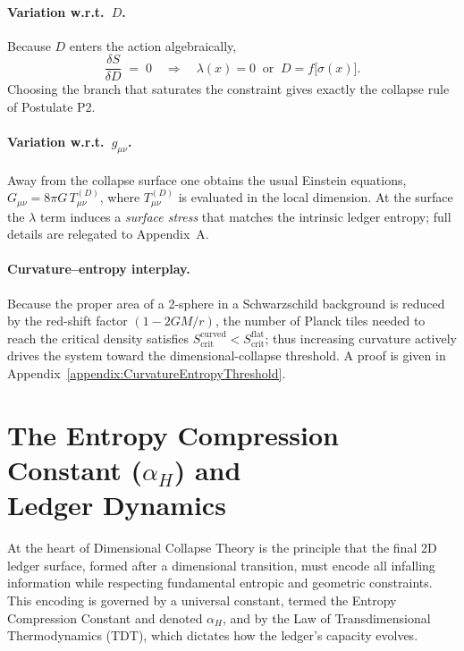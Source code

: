 \documentclass[a4paper, 12pt, oneside]{book}
\numberwithin{equation}{chapter}
\begin{document}
\paragraph{Variation w.r.t.~$D$.}
Because $D$ enters the action algebraically,
\[
    \frac{\delta S}{\delta D}\;=\;0
    \quad\Longrightarrow\quad
    \lambda(x) = 0
    \;\;\text{or}\;\;
    D = f\!\bigl[\sigma(x)\bigr].
\]
Choosing the branch that saturates the constraint gives
exactly the collapse rule of Postulate P2.

\paragraph{Variation w.r.t.~$g_{\mu\nu}$.}
Away from the collapse surface one obtains the usual
Einstein equations,
\( G_{\mu\nu}=8\pi G\,T_{\mu\nu}^{(D)}\),
where $T_{\mu\nu}^{(D)}$ is evaluated in the local dimension.
At the surface the $\lambda$ term
induces a \emph{surface stress} that matches the intrinsic
ledger entropy; full details are relegated
to Appendix~A.

\paragraph*{Curvature–entropy interplay.}
Because the proper area of a 2-sphere in a Schwarzschild background is
reduced by the red-shift factor $(1-2GM/r)$, the number of Planck tiles
needed to reach the critical density satisfies
$S_{\text{crit}}^{\mathrm{curved}} < S_{\text{crit}}^{\mathrm{flat}}$;
thus increasing curvature actively drives the system toward the
dimensional-collapse threshold.  A proof is given in
Appendix~\ref{appendix:CurvatureEntropyThreshold}.

\section[The \texorpdfstring{$\alpha_H$}{alphaH} Constant and Ledger Dynamics]{The Entropy Compression Constant ($\alpha_H$) and \\ Ledger Dynamics}
\label{sec:AlphaH}

At the heart of Dimensional Collapse Theory is the principle that the final 2D ledger surface, formed after a dimensional transition, must encode all infalling information while respecting fundamental entropic and geometric constraints. This encoding is governed by a universal constant, termed the Entropy Compression Constant and denoted $\alpha_H$, and by the Law of Transdimensional Thermodynamics (TDT), which dictates how the ledger's capacity evolves.
\end{document}
